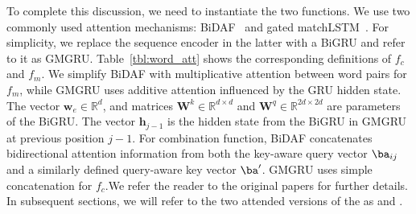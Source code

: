 To complete this discussion, we need to instantiate the two
functions. We use two commonly used attention mechanisms:
BiDAF~\cite{bidaf} and gated matchLSTM~\cite{wang2017gated}. For
simplicity, we replace the sequence encoder in the latter with a BiGRU
and refer to it as GMGRU. Table~\ref{tbl:word_att} shows the
corresponding definitions of $f_{c}$ and $f_{m}$. We simplify BiDAF
with multiplicative attention between word pairs for $f_{m}$, while
GMGRU uses additive attention influenced by the GRU hidden state.  The
vector $\bm{w}_{e} \in\mathbb{R}^{d}$, and matrices
$\bm{W}^{k}\in \mathbb{R}^{d \times d}$ and
$\bm{W}^{q} \in\mathbb{R}^{2d \times 2d}$ are parameters of the BiGRU. The
vector $\bm{h}_{j-1}$ is the hidden state from the BiGRU in GMGRU at
previous position $j-1$.  For combination function, BiDAF concatenates
bidirectional attention information from both the key-aware query
vector $\ba_{ij}$ and a similarly defined query-aware key vector
$\ba^{\prime}$. GMGRU uses simple concatenation for $f_c$.We refer the
reader to the original papers for further details. In subsequent
sections, we will refer to the two attended versions of the \HGRU as
\BiDAFH and \GMGRUH.



